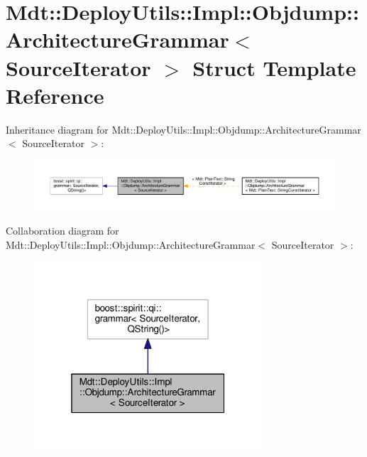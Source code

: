 \hypertarget{struct_mdt_1_1_deploy_utils_1_1_impl_1_1_objdump_1_1_architecture_grammar}{}\section{Mdt\+:\+:Deploy\+Utils\+:\+:Impl\+:\+:Objdump\+:\+:Architecture\+Grammar$<$ Source\+Iterator $>$ Struct Template Reference}
\label{struct_mdt_1_1_deploy_utils_1_1_impl_1_1_objdump_1_1_architecture_grammar}


Inheritance diagram for Mdt\+:\+:Deploy\+Utils\+:\+:Impl\+:\+:Objdump\+:\+:Architecture\+Grammar$<$ Source\+Iterator $>$\+:
\nopagebreak
\begin{figure}[H]
\begin{center}
\leavevmode
\includegraphics[width=350pt]{struct_mdt_1_1_deploy_utils_1_1_impl_1_1_objdump_1_1_architecture_grammar__inherit__graph}
\end{center}
\end{figure}


Collaboration diagram for Mdt\+:\+:Deploy\+Utils\+:\+:Impl\+:\+:Objdump\+:\+:Architecture\+Grammar$<$ Source\+Iterator $>$\+:
\nopagebreak
\begin{figure}[H]
\begin{center}
\leavevmode
\includegraphics[width=241pt]{struct_mdt_1_1_deploy_utils_1_1_impl_1_1_objdump_1_1_architecture_grammar__coll__graph}
\end{center}
\end{figure}



